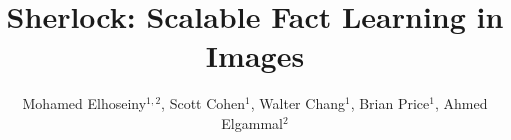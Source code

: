 \documentclass[runningheads]{llncs}
\begin{document}
\pagestyle{headings}
\mainmatter
\title{Sherlock: Scalable Fact Learning in Images} %

\author{ \small Mohamed Elhoseiny$^{1,2}$,  Scott Cohen$^{1}$,  Walter Chang$^{1}$,  Brian Price$^{1}$, Ahmed  Elgammal$^{2}$ \normalsize }

% 
 
 \graphicspath{{./retrieval_qual3_seen_crop/}{./retrieval_qual3_unseen_crop/}{./KEx_qual2_crop/}{.//KEx_qual2_unseen_crop/}{./ret_qual3_gt5_seen_crop/}
 }
 

\maketitle
\end{document}

